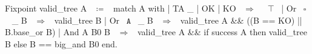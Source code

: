 \begin{coqcode}
  Fixpoint valid_tree A ~$\coloneq$~
    match A with
    | TA _ | OK | KO ~$\Rightarrow$~ ~$\top$~
    | Or ~$\square$~ _ B ~$\Rightarrow$~ valid_tree B
    | Or ~$\boxed{\texttt{A}}$~ _ B ~$\Rightarrow$~ valid_tree A && 
          ((B == KO) || B.base_or B)
    | And A B0 B ~$\Rightarrow$~ valid_tree A &&
        if success A then valid_tree B 
        else B == big_and B0
    end.
\end{coqcode}
